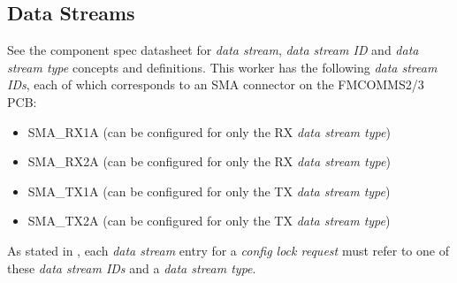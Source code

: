 \documentclass{article}
\begin{document}
  \subsection{Data Streams}
    See the component spec datasheet for
    \textit{data stream}, \textit{data stream ID}
    and
    \textit{data stream type}
    concepts and definitions\cite{dig_radio_ctrlr_comp_datasheet}.
    This worker has the following \textit{data stream IDs}, each of which
    corresponds to an SMA connector on the FMCOMMS2/3 PCB:
    \begin{itemize}
      \item SMA\_RX1A (can be configured for only the RX \textit{data stream type})
      \item SMA\_RX2A (can be configured for only the RX \textit{data stream type})
      \item SMA\_TX1A (can be configured for only the TX \textit{data stream type})
      \item SMA\_TX2A (can be configured for only the TX \textit{data stream type})
    \end{itemize}
    As stated in \cite{dig_radio_ctrlr_comp_datasheet},
    each \textit{data stream} entry for a \textit{config lock request} must
    refer to one of these \textit{data stream IDs} and a
    \textit{data stream type}.
\end{document}
